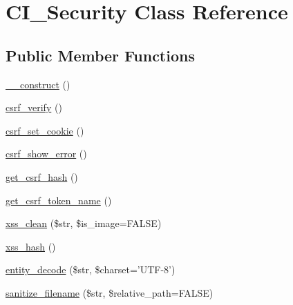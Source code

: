 \hypertarget{class_c_i___security}{\section{C\-I\-\_\-\-Security Class Reference}
\label{class_c_i___security}
}
\subsection*{Public Member Functions}
\begin{DoxyCompactItemize}
\item 
\hyperlink{class_c_i___security_a095c5d389db211932136b53f25f39685}{\-\_\-\-\_\-construct} ()
\item 
\hyperlink{class_c_i___security_a03c037268db0c2e6221b65a736eaee07}{csrf\-\_\-verify} ()
\item 
\hyperlink{class_c_i___security_a55b1380b93b71ab3d9873bb967c2b9bb}{csrf\-\_\-set\-\_\-cookie} ()
\item 
\hyperlink{class_c_i___security_a3d09c1dc706abfaad987661805c28a06}{csrf\-\_\-show\-\_\-error} ()
\item 
\hyperlink{class_c_i___security_a1644fd8967db3a1b94988d730ca34991}{get\-\_\-csrf\-\_\-hash} ()
\item 
\hyperlink{class_c_i___security_a00640f51b90b7d946e9d3a4f0c9f628e}{get\-\_\-csrf\-\_\-token\-\_\-name} ()
\item 
\hyperlink{class_c_i___security_acb759426dbab128d3d8164805225381c}{xss\-\_\-clean} (\$str, \$is\-\_\-image=F\-A\-L\-S\-E)
\item 
\hyperlink{class_c_i___security_ae2f831d3f277e1c03730b28fd1734186}{xss\-\_\-hash} ()
\item 
\hyperlink{class_c_i___security_a07306fa600cc7b6de1aa512ba6462975}{entity\-\_\-decode} (\$str, \$charset='U\-T\-F-\/8')
\item 
\hyperlink{class_c_i___security_aaba16489285496bdc03fd12f699a08f6}{sanitize\-\_\-filename} (\$str, \$relative\-\_\-path=F\-A\-L\-S\-E)
\end{DoxyCompactItemize}

